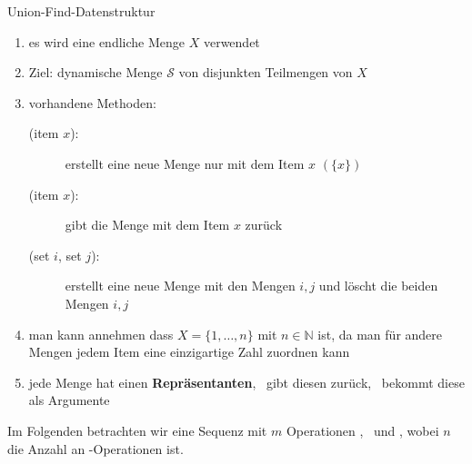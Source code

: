 \begin{TOP}{Union-Find-Datenstruktur}
\vspace*{-2\baselineskip}
	\begin{enumerate}
		\item es wird eine endliche Menge $X$ verwendet
		\item Ziel: dynamische Menge $\mathcal{S}$ von disjunkten Teilmengen von $X$
		\item vorhandene Methoden:
			\begin{description}
				\item[\makeset(item $x$):] erstellt eine neue Menge nur mit dem Item $x$ $(\{x\})$
				\item[\find(item $x$):] gibt die Menge mit dem Item $x$ zurück
				\item[\union(set $i$, set $j$):] erstellt eine neue Menge mit den Mengen $i,j$ und löscht die beiden Mengen $i,j$
			\end{description}
		\item man kann annehmen dass $X=\{1,\dots,n\}$ mit $n \in \mathbb{N}$ ist, da man für andere Mengen jedem Item eine einzigartige Zahl zuordnen kann
		\item jede Menge hat einen \textbf{Repräsentanten}, \find~gibt diesen zurück, \union~bekommt diese als Argumente
	\end{enumerate}
	Im Folgenden betrachten wir eine Sequenz mit $m$ Operationen \makeset, \find~und \union, wobei $n$ die Anzahl an \makeset-Operationen ist.\\\ \\
\end{TOP}